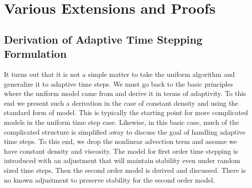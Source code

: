 \documentclass[letterpaper]{erdc}
\begin{document}
%
%
%
%
\chapter{Various Extensions and Proofs}

%
%
%
\section{Derivation of Adaptive Time Stepping Formulation}\label{sec:VariableTimeSteppingAppendix}
It turns out that it is not a simple matter to take the uniform algorithm and generalize it to adaptive time steps.  We must go back to the basic principles where the uniform model came from and derive it in terms of adaptivity.  To this end we present such a derivation in the case of constant density and using the standard form of model.  This is typically the starting point for more complicated models in the uniform time step case.  Likewise, in this basic case, much of the complicated structure is simplified away to discuss the goal of handling adaptive time steps.  To this end, we drop the nonlinear advection term and assume we have constant density and viscosity.  The model for first order time stepping is introduced with an adjustment that will maintain stability even under random sized time steps.  Then the second order model is derived and discussed.  There is no known adjustment to preserve stability for the second order model.


%
%
\end{document}

